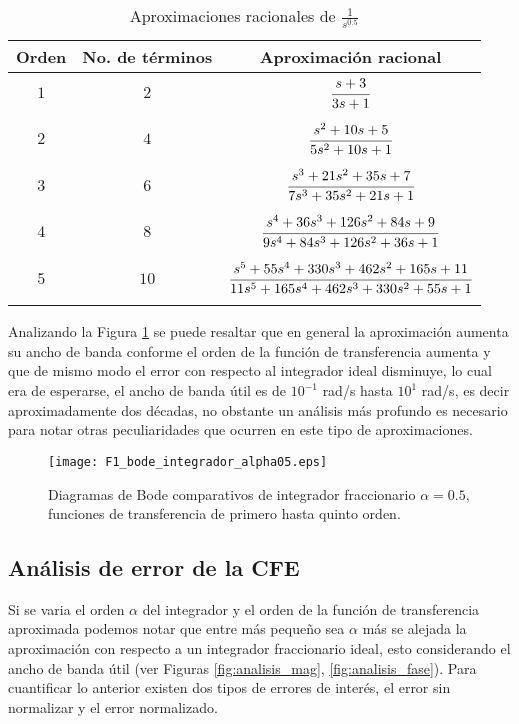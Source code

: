 	\begin{table}[!hbp]
		\caption{Aproximaciones racionales de $\frac{1}{s^{0.5}}$}
		\label{tab:aprox_cfe_alpha_0.5}
		\centering
		\begin{tabular}{c c c}
			\hline
			\textbf{Orden} &  \textbf{No. de términos} & \textbf{Aproximación racional}\\
			\hline
			$1$ 		& $2$ 		&  $\cfrac{s + 3}{3s + 1}$\\
					 		& 		 		& \\
			$2$			& $4$ 		&  $\cfrac{s^{2} + 10s + 5}{5 s^{2} + 10s + 1}$\\
							& 		 		& \\
			$3$ 		& $6$ 		&  $\cfrac{s^{3} + 21s^{2} + 35s + 7}{7 s^3 + 35 s^2 + 21 s + 1}$	\\
							& 		 		& \\
			$4$ 		& $8$ 		&  $\cfrac{s^4 + 36 s^3 + 126 s^2 + 84 s + 9}{9 s^4 + 84 s^3 + 126 s^2 + 36 s + 1}$\\
							& 		 		& \\
			$5$ 		& $10$ 		&  $\cfrac{s^5 + 55 s^4 + 330 s^3 + 462 s^2 + 165 s + 11}{11 s^5 + 165 s^4 + 462 s^3 + 330 s^2 + 55 s + 1}$\\
							& 		 		& \\
			\hline
		\end{tabular}
	\end{table}
	
	Analizando la Figura \ref{fig:F1_bode_integrador_alpha05} se puede resaltar que en general la aproximación aumenta su ancho de banda conforme el orden de la función de transferencia aumenta y que de mismo modo el error con respecto al integrador ideal disminuye, lo cual era de esperarse, el ancho de banda útil es de $10^{-1}$ rad/s hasta $10^{1}$ rad/s, es decir aproximadamente dos décadas, no obstante un análisis más profundo es necesario para notar otras peculiaridades que ocurren en este tipo de aproximaciones.
	
	\begin{figure}[hbtp]
		\caption{Diagramas de Bode comparativos de integrador fraccionario $\alpha = 0.5$, funciones de transferencia de primero hasta quinto orden.} 
		\label{fig:F1_bode_integrador_alpha05}
		\centering
		\texttt{[image: F1\_bode\_integrador\_alpha05.eps]}
	\end{figure}
	
	\subsection{Análisis de error de la CFE}
	Si se varia el orden $\alpha$ del integrador y el orden de la función de transferencia aproximada podemos notar que entre más pequeño sea $\alpha$ más se alejada la aproximación con respecto a un integrador fraccionario ideal, esto considerando el ancho de banda útil (ver Figuras \ref{fig:analisis_mag}, \ref{fig:analisis_fase}). Para cuantificar lo anterior existen dos tipos de errores de interés, el error sin normalizar y el error normalizado.
	

